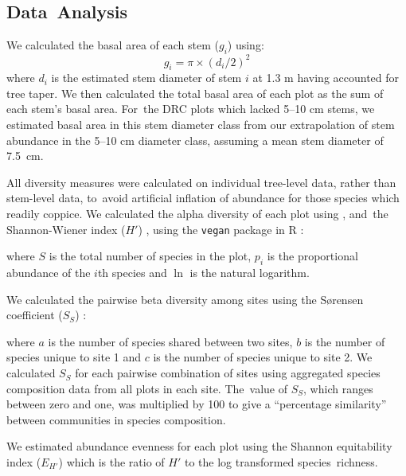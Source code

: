 \documentclass[diversity,article,accept,moreauthors,pdftex]{Definitions/mdpi}
\begin{document}
\subsection{Data~Analysis}

We calculated the basal area of each stem ($g_{i}$) using:
\begin{equation}
	g_{i} = \pi{} \times (d_{i} / 2)^{2}
\end{equation}
where $d_{i}$ is the estimated stem diameter of stem $i$ at 1.3 m having accounted for tree taper. We then calculated the total basal area of each plot as the sum of each stem's basal area. For~the DRC plots which lacked 5--10 cm stems, we estimated basal area in this stem diameter class from our extrapolation of stem abundance in the 5--10 cm diameter class, assuming a mean stem diameter of 7.5~cm.

All diversity measures were calculated on individual tree-level data, rather than stem-level data, to~avoid artificial inflation of abundance for those species which readily coppice. We calculated the alpha diversity of each plot using , and~the Shannon-Wiener index ($H'$) , using the \texttt{vegan} package in R \citep{vegan}:

{where $S$ is the total number of species in the plot, $p_{i}$ is the proportional abundance of the $i$th species and $\ln$ is the natural logarithm.}

We calculated the pairwise beta diversity among sites using the S\o{}rensen coefficient ($S_{S}$)  
\citep{Koleff2003}:

{where $a$ is the number of species shared between two sites, $b$ is the number of species unique to site 1 and $c$ is the number of species unique to site 2. We calculated $S_{S}$ for each pairwise combination of sites using aggregated species composition data from all plots in each site. The~value of $S_{S}$, which ranges between zero and one, was multiplied by 100 to give a ``percentage similarity'' between communities in species composition.}

We estimated abundance evenness for each plot using the Shannon equitability index ($E_{H'}$) \citep{Smith1996} which is the ratio of $H'$ to the log transformed species~richness.
\end{document}
